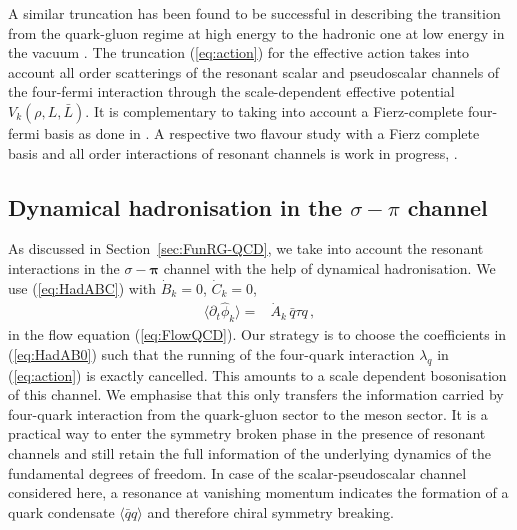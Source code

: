 \documentclass[%
reprint,
superscriptaddress,
showpacs,preprintnumbers,
 amsmath,amssymb,
 aps,
prd,
]{revtex4-1}
\def\eq#1{(\ref{#1})}
\def\sec#1{Section~\ref{#1}}
\begin{document}
A similar truncation has been found to be successful in describing the
transition from the quark-gluon regime at high energy to the hadronic
one at low energy in the vacuum \cite{Braun:2014ata}. The truncation
\eq{eq:action} for the effective action takes into account all order
scatterings of the resonant scalar and pseudoscalar channels of the
four-fermi interaction through the scale-dependent effective potential
$V_k(\rho,L,\bar L)$. It is complementary to taking into account a
Fierz-complete four-fermi basis as done in \cite{Mitter:2014wpa,
  Cyrol:2017ewj, Braun:2017srn, Braun:2018bik, Leonhardt:2019fua}. A
respective two flavour study with a Fierz complete basis and all order
interactions of resonant channels is work in progress,
\cite{fQCD:2019a}.



\subsection{Dynamical hadronisation in 
  the $\sigma-\pi$ channel}\label{sec:DynHad}

As discussed in \sec{sec:FunRG-QCD}, we take into account the resonant
interactions in the $\sigma-\bm{\pi}$ channel with the help of
dynamical hadronisation. We use \eq{eq:HadABC} with ${\dot B}_k=0$,
${\dot C}_k=0$,
%
\begin{align}\label{eq:HadAB0}
  \langle   \partial_t \hat \phi_k\rangle =&\dot{A}_k \,\bar{q}\tau q\,, 
\end{align}
%
in the flow equation \eq{eq:FlowQCD}. Our strategy is to choose the
coefficients in \eq{eq:HadAB0} such that the running of the
four-quark interaction $\lambda_q$ in \eq{eq:action} is exactly
cancelled. This amounts to a scale dependent bosonisation of this
channel. We emphasise that this only transfers the information carried
by four-quark interaction from the quark-gluon sector to the meson
sector. It is a practical way to enter the symmetry broken phase in
the presence of resonant channels and still retain the full
information of the underlying dynamics of the fundamental degrees of
freedom. In case of the scalar-pseudoscalar channel considered here, a
resonance at vanishing momentum indicates the formation of a quark
condensate $\langle \bar q q \rangle$ and therefore chiral symmetry
breaking.
\end{document}
